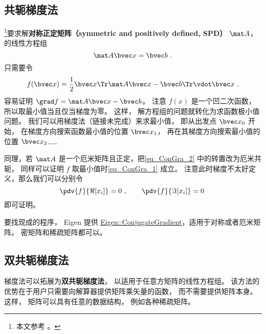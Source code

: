 
\begin{issues}
\issueDraft
\end{issues}


\subsection{共轭梯度法}

\footnote{本文参考 \cite{NR3}。}要求解\textbf{对称正定矩阵（symmetric and positively defined, SPD）} $\mat A$， 的线性方程组
\begin{equation}\label{eq_ConGra_1}
\mat A \bvec x = \bvec b~.
\end{equation}
只需要令
\begin{equation}\label{eq_ConGra_2}
f(\bvec x) = \frac{1}{2}\bvec x\Tr \mat A\bvec x - \bvec b\Tr \vdot \bvec x~.
\end{equation}
容易证明 $\grad f = \mat A \bvec x - \bvec b$。 注意 $f(x)$ 是一个凹二次函数， 所以取最小值当且仅当梯度为零。 这样， 解方程组的问题就转化为求函数极小值问题。 我们可以用梯度法（链接未完成）来求最小值， 即从出发点 $\bvec x_0$ 开始， 在梯度方向搜索函数最小值的位置 $\bvec x_1$， 再在其梯度方向搜索最小值的位置 $\bvec x_2$……

同理，若 $\mat A$ 是一个厄米矩阵且正定，把\autoref{eq_ConGra_2} 中的转置改为厄米共轭， 同样可以证明 $f$ 取最小值时\autoref{eq_ConGra_1} 成立。 注意此时梯度不太好定义，那么我们可以分别令
\begin{equation}
\pdv{f}{\Re[x_i]} = 0~, \qquad  \pdv{f}{\Im[x_i]} = 0~
\end{equation}
即可证明。

要找现成的程序， Eigen 提供 \href{https://eigen.tuxfamily.org/dox/classEigen_1_1ConjugateGradient.html}{Eigen::ConjugateGradient}，适用于对称或者厄米矩阵。 密矩阵和稀疏矩阵都可以。

\subsection{双共轭梯度法}

梯度法可以拓展为\textbf{双共轭梯度法}， 以适用于任意方矩阵的线性方程组。 该方法的优势在于用户只需要向解算器提供矩阵乘矢量的函数， 而不需要提供矩阵本身。 这样， 矩阵可以具有任意的数据结构， 例如各种稀疏矩阵。

